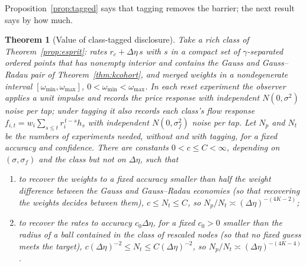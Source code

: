 \documentclass[12pt]{article}
\newtheorem{theorem}{Theorem}[section]
\theoremstyle{definition}
\theoremstyle{remark}
\begin{document}
Proposition~\ref{prop:tagged} says that tagging removes the barrier; the next result says by how much.

\begin{theorem}[Value of class-tagged disclosure]\label{thm:discvalue}
Take a rich class of Theorem~\ref{prop:esprit}: rates $r_c+\Delta\eta\,s$ with $s$ in a compact set of $\gamma$-separated ordered points that has nonempty interior and contains the Gauss and Gauss--Radau pair of Theorem~\ref{thm:kcohort}, and merged weights in a nondegenerate interval $[\omega_{\min},\omega_{\max}]$, $0<\omega_{\min}<\omega_{\max}$. In each reset experiment the observer applies a unit impulse and records the price response with independent $N(0,\sigma^2)$ noise per tap; under tagging it also records each class's flow response $f_{i,t}=w_i\sum_{s\le t}r_i^{\,t-s}h_s$ with independent $N(0,\sigma_f^2)$ noise per tap. Let $N_p$ and $N_t$ be the numbers of experiments needed, without and with tagging, for a fixed accuracy and confidence. There are constants $0<c\le C<\infty$, depending on $(\sigma,\sigma_f)$ and the class but not on $\Delta\eta$, such that
\begin{enumerate}[label=(\roman*),itemsep=1pt]
\item to recover the weights to a fixed accuracy smaller than half the weight difference between the Gauss and Gauss--Radau economies (so that recovering the weights decides between them), $c\le N_t\le C$, so $N_p/N_t\asymp(\Delta\eta)^{-(4K-2)}$;
\item to recover the rates to accuracy $c_0\Delta\eta$, for a fixed $c_0>0$ smaller than the radius of a ball contained in the class of rescaled nodes (so that no fixed guess meets the target), $c(\Delta\eta)^{-2}\le N_t\le C(\Delta\eta)^{-2}$, so $N_p/N_t\asymp(\Delta\eta)^{-(4K-4)}$.
\end{enumerate}
\end{theorem}
\end{document}
